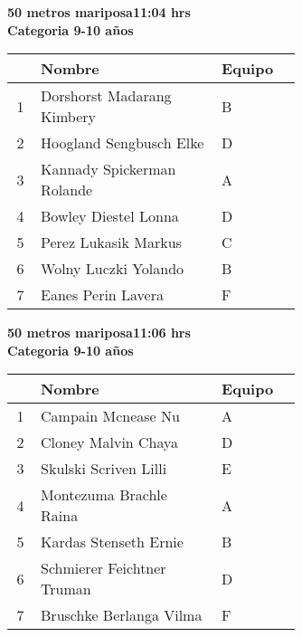 \begin{minipage}{0.95\linewidth}\vspace{0.5cm} 
\begin{flushleft}
\textbf{
\hspace{-0.15cm}50 metros mariposa\hspace{1.5cm}11:04 hrs \\Categoria 9-10 años}\vspace{-0.2cm} 
\end{flushleft}
\begin{tabular}{cp{0.63\linewidth}l}
\hline
& \textbf{Nombre} & \textbf{Equipo} \\ \hline
1 & Dorshorst Madarang Kimbery & B \\ 
2 & Hoogland Sengbusch Elke & D \\ 
3 & Kannady Spickerman Rolande & A \\ 
4 & Bowley Diestel Lonna & D \\ 
5 & Perez Lukasik Markus & C \\ 
6 & Wolny Luczki Yolando & B \\ 
7 & Eanes Perin Lavera & F \\ 
\end{tabular}
\end{minipage}
\begin{minipage}{0.95\linewidth}\vspace{0.5cm} 
\begin{flushleft}
\textbf{
\hspace{-0.15cm}50 metros mariposa\hspace{1.5cm}11:06 hrs \\Categoria 9-10 años}\vspace{-0.2cm} 
\end{flushleft}
\begin{tabular}{cp{0.63\linewidth}l}
\hline
& \textbf{Nombre} & \textbf{Equipo} \\ \hline
1 & Campain Mcnease Nu & A \\ 
2 & Cloney Malvin Chaya & D \\ 
3 & Skulski Scriven Lilli & E \\ 
4 & Montezuma Brachle Raina & A \\ 
5 & Kardas Stenseth Ernie & B \\ 
6 & Schmierer Feichtner Truman & D \\ 
7 & Bruschke Berlanga Vilma & F \\ 
\end{tabular}
\end{minipage}
